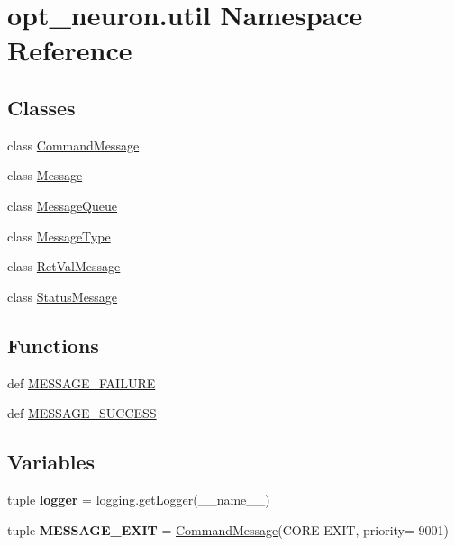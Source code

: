 \hypertarget{namespaceopt__neuron_1_1util}{}\section{opt\+\_\+neuron.\+util Namespace Reference}
\label{namespaceopt__neuron_1_1util}
\subsection*{Classes}
\begin{DoxyCompactItemize}
\item 
class \hyperlink{classopt__neuron_1_1util_1_1CommandMessage}{Command\+Message}
\item 
class \hyperlink{classopt__neuron_1_1util_1_1Message}{Message}
\item 
class \hyperlink{classopt__neuron_1_1util_1_1MessageQueue}{Message\+Queue}
\item 
class \hyperlink{classopt__neuron_1_1util_1_1MessageType}{Message\+Type}
\item 
class \hyperlink{classopt__neuron_1_1util_1_1RetValMessage}{Ret\+Val\+Message}
\item 
class \hyperlink{classopt__neuron_1_1util_1_1StatusMessage}{Status\+Message}
\end{DoxyCompactItemize}
\subsection*{Functions}
\begin{DoxyCompactItemize}
\item 
def \hyperlink{namespaceopt__neuron_1_1util_af098e684cfbe107a15a9d310284628d3}{M\+E\+S\+S\+A\+G\+E\+\_\+\+F\+A\+I\+L\+U\+R\+E}
\item 
def \hyperlink{namespaceopt__neuron_1_1util_a2eb6a7a07da50fc7320697c48723e0b7}{M\+E\+S\+S\+A\+G\+E\+\_\+\+S\+U\+C\+C\+E\+S\+S}
\end{DoxyCompactItemize}
\subsection*{Variables}
\begin{DoxyCompactItemize}
\item 
\hypertarget{namespaceopt__neuron_1_1util_ab57c39db5d02d0df922c1af5d3cbedc0}{}tuple {\bfseries logger} = logging.\+get\+Logger(\+\_\+\+\_\+name\+\_\+\+\_\+)\label{namespaceopt__neuron_1_1util_ab57c39db5d02d0df922c1af5d3cbedc0}

\item 
\hypertarget{namespaceopt__neuron_1_1util_a3337867d8d4764270f1ce370df558f79}{}tuple {\bfseries M\+E\+S\+S\+A\+G\+E\+\_\+\+E\+X\+I\+T} = \hyperlink{classopt__neuron_1_1util_1_1CommandMessage}{Command\+Message}(\textquotesingle{}C\+O\+R\+E-\/E\+X\+I\+T\textquotesingle{}, priority=-\/9001)\label{namespaceopt__neuron_1_1util_a3337867d8d4764270f1ce370df558f79}

\end{DoxyCompactItemize}


